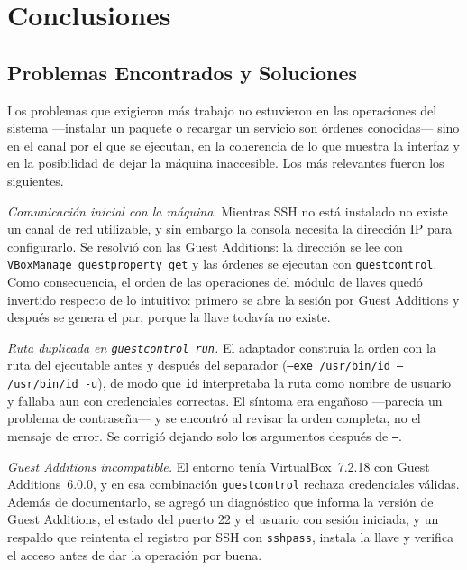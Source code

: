 \section{Conclusiones}
\label{sec:conclusiones-apartado}

\subsection{Problemas Encontrados y Soluciones}
\label{sec:problemas}

Los problemas que exigieron más trabajo no estuvieron en las operaciones
del sistema ---instalar un paquete o recargar un servicio son órdenes
conocidas--- sino en el canal por el que se ejecutan, en la coherencia de
lo que muestra la interfaz y en la posibilidad de dejar la máquina
inaccesible. Los más relevantes fueron los siguientes.

\emph{Comunicación inicial con la máquina.} Mientras SSH no está
instalado no existe un canal de red utilizable, y sin embargo la consola
necesita la dirección IP para configurarlo. Se resolvió con las Guest
Additions: la dirección se lee con \texttt{VBoxManage guestproperty get}
y las órdenes se ejecutan con \texttt{guestcontrol}. Como consecuencia,
el orden de las operaciones del módulo de llaves quedó invertido
respecto de lo intuitivo: primero se abre la sesión por Guest Additions y
después se genera el par, porque la llave todavía no existe.

\emph{Ruta duplicada en \texttt{guestcontrol run}.} El adaptador
construía la orden con la ruta del ejecutable antes y después del
separador (\texttt{--exe /usr/bin/id -- /usr/bin/id -u}), de modo que
\texttt{id} interpretaba la ruta como nombre de usuario y fallaba aun con
credenciales correctas. El síntoma era engañoso ---parecía un problema de
contraseña--- y se encontró al revisar la orden completa, no el mensaje
de error. Se corrigió dejando solo los argumentos después de
\texttt{--}.

\emph{Guest Additions incompatible.} El entorno tenía VirtualBox~7.2.18
con Guest Additions~6.0.0, y en esa combinación
\texttt{guestcontrol} rechaza credenciales válidas. Además de
documentarlo, se agregó un diagnóstico que informa la versión de Guest
Additions, el estado del puerto 22 y el usuario con sesión iniciada, y un
respaldo que reintenta el registro por SSH con \texttt{sshpass},
instala la llave y verifica el acceso antes de dar la operación por
buena.

